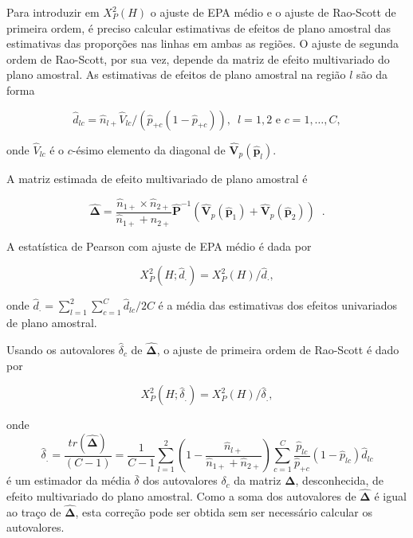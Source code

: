 \documentclass[]{book}
\numberwithin{example}{chapter}
\numberwithin{remark}{chapter}
\numberwithin{definition}{chapter}
\begin{document}
Para introduzir em \(X_{P}^{2}\left( H\right)\) o ajuste de EPA médio e
o ajuste de Rao-Scott de primeira ordem, é preciso calcular estimativas
de efeitos de plano amostral das estimativas das proporções nas linhas
em ambas as regiões. O ajuste de segunda ordem de Rao-Scott, por sua
vez, depende da matriz de efeito multivariado do plano amostral. As
estimativas de efeitos de plano amostral na região \(l\) são da forma

\begin{equation}
\hat{d}_{lc}=\widehat{n}_{l+}\hat{V}_{lc}/\left( \hat{p}_{+c}\left( 1-\hat{p}
_{+c}\right) \right) ,\ \;l=1,2\mbox{ e }c=1,\ldots ,C,  \label{eq:Tab5}
\end{equation}

onde \(\hat{V}_{lc}\) é o \(c\)-ésimo elemento da diagonal de
\(\mathbf{ \hat{V}}_{p}\left( \widehat{\mathbf{p}}_{l}\right)\).

A matriz estimada de efeito multivariado de plano amostral é

\begin{equation}
\mathbf{\hat{\Delta}=}\frac{\widehat{n}_{1+}\times \widehat{n}_{2+}}{
\widehat{n}_{1+}+\widehat{n}_{2+}}\mathbf{\hat{P}}^{-1}\left( \mathbf{\hat{V}
}_{p}\left( \widehat{\mathbf{p}}_{1}\right) +\mathbf{\hat{V}}_{p}\left( 
\widehat{\mathbf{p}}_{2}\right) \right) \;\;.  \label{eq:Tab6}
\end{equation}

A estatística de Pearson com ajuste de EPA médio é dada por

\begin{equation}
X_{P}^{2}\left( H;\hat{d}_{\cdot }\right) =X_{P}^{2}\left( H\right) /\hat{d}
_{\cdot },  \label{eq:Tab7}
\end{equation}

onde
\(\hat{d}_{\cdot }=\sum\limits_{l=1}^{2}\sum\limits_{c=1}^{C}\hat{d} _{lc}/2C\)
é a média das estimativas dos efeitos univariados de plano amostral.

Usando os autovalores \(\hat{\delta}_{c}\) de \(\mathbf{\hat{\Delta}}\),
o ajuste de primeira ordem de Rao-Scott é dado por

\begin{equation}
X_{P}^{2}\left( H;\hat{\delta}_{.}\right) =X_{P}^{2}\left( H\right) /\hat{
\delta}_{.},  \label{eq:Tab8}
\end{equation}

onde \[
\hat{\delta}_{.}=\frac{tr\left( \mathbf{\hat{\Delta}}\right) }{\left(
C-1\right) }=\frac{1}{C-1}\sum\limits_{l=1}^{2}\left( 1-\frac{\widehat{n}
_{l+}}{\widehat{n}_{1+}+\widehat{n}_{2+}}\right) \sum\limits_{c=1}^{C}\frac{
\hat{p}_{lc}}{\hat{p}_{+c}}\left( 1-\hat{p}_{lc}\right) \hat{d}_{lc} 
\] é um estimador da média \(\bar{\delta}\) dos autovalores
\(\delta _{c}\) da matriz \(\mathbf{\Delta }\), desconhecida, de efeito
multivariado do plano amostral. Como a soma dos autovalores de
\(\mathbf{\hat{\Delta}}\) é igual ao traço de \(\mathbf{\hat{\Delta}}\),
esta correção pode ser obtida sem ser necessário calcular os
autovalores.
\end{document}
